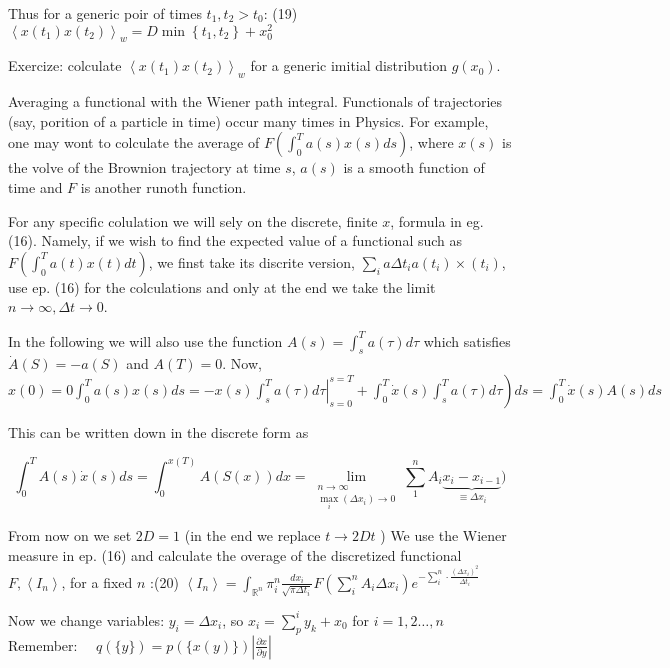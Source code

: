 Thus for a generic poir of times $t_{1}, t_{2}>t_{0}$:
(19) $\left\langle x\left(t_{1}\right) x\left(t_{2}\right)\right\rangle_{w}=D \min \left\{t_{1}, t_{2}\right\}+x_{0}^{2}$

Exercize: colculate $\left\langle x\left(t_{1}\right) x\left(t_{2}\right)\right\rangle_{w}$ for a generic imitial distribution $g\left(x_{0}\right)$.

Averaging a functional with the Wiener path integral.
Functionals of trajectories (say, porition of a particle in time) occur many times in Physics. For example, one may wont to colculate the average of $F\left(\int_{0}^{T} a(s) x(s) d s\right)$, where $x(s)$ is the volve of the Brownion trajectory at time $s$, $a(s)$ is a smooth function of time and $F$ is another runoth function.

For any specific colulation we will sely on the discrete, finite $x$, formula in eg. (16). Namely, if we wish to find the expected value of a functional such as $F\left(\int_{0}^{T} a(t) x(t) d t\right)$, we finst take its discrite version, $\sum_{i}{a} \Delta t_{i} a\left(t_{i}\right) \times\left(t_{i}\right)$, use ep. (16) for the colculations and only at the end we take the limit $n \rightarrow \infty, \Delta t \rightarrow 0$.

In the following we will also use the function $A(s)=\int_{s}^{T} a(\tau) d \tau$ which satisfies $\dot{A}(S)=-a(S)$ and $A(T)=0$. Now, $x(0)=0 \left.\int_{0}^{T} a(s) x(s) d s=-\left.x(s) \int_{s}^{T} a(\tau) d \tau\right|_{s=0} ^{s=T}+\int_{0}^{T} \dot{x}(s) \int_{s}^{T} a(\tau) d \tau\right) d s=\int_{0}^{T} \dot{x}(s) A(s) d s$

This can be written down in the discrete form as

$$ 
\int_{0}^{T} A(s) \dot{x}(s) d s=\int_{0}^{x(T)} A(S(x)) d x=\lim _{\substack{n \rightarrow \infty \\ \max _{i}\left(\Delta x_{i}\right) \rightarrow 0}} \sum_{1}^{n} A_{i} \underbrace{x_{i}-x_{i-1}}_{\equiv \Delta x_{i}})
$$ 

From now on we set $2 D=1$ (in the end we replace $t \rightarrow 2 D t$ ) We use the Wiener measure in ep. (16) and calculate the overage of the discretized functional $F,\left\langle I_{n}\right\rangle$, for a fixed $n$ :\n(20) $\left\langle I_{n}\right\rangle=\int_{\mathbb{R}^{n}} \pi_{i}^{n} \frac{d x_{i}}{\sqrt{\pi \Delta t_{i}}} F\left(\sum_{i}^{n} A_{i} \Delta x_{i}\right) e^{-\sum_{i}^{n} \cdot \frac{\left(\Delta x_{i}\right)^{2}}{\Delta t_{i}}}$

Now we change variables: $y_{i}=\Delta x_{i}$, so $x_{i}=\sum_{p}^{i} y_{k}+x_{0}$ for $i=1,2 \ldots, n$
Remember: $\quad q(\{y\})=p(\{x(y)\})\left|\frac{\partial x}{\partial y}\right|$

